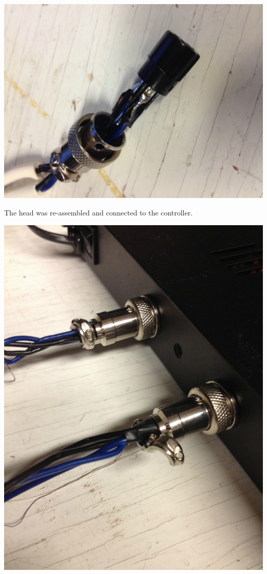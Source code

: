 \documentclass[11pt]{article} %
\begin{document}
\begin{center}
\includegraphics[scale=0.10]{wiring/08.jpeg}
\end{center}

The head was re-assembled and connected to the controller.

\begin{center}
\includegraphics[scale=0.10]{wiring/09.jpeg}
\end{center}
\end{document}
